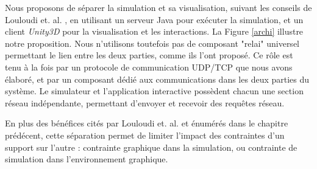 	
	Nous proposons de séparer la simulation et sa visualisation, suivant les conseils de Louloudi et. al. \cite{louloudi_new_2012}, en utilisant un serveur Java pour exécuter la simulation, et un client \textit{Unity3D} pour la visualisation et les interactions. La Figure \ref{archi} illustre notre proposition. Nous n'utilisons toutefois pas de composant "relai" universel permettant le lien entre les deux parties, comme ils l'ont proposé. Ce rôle est tenu à la fois par un protocole de communication UDP/TCP que nous avons élaboré, et par un composant dédié aux communications dans les deux parties du système. Le simulateur et l'application interactive possèdent chacun une section réseau indépendante, permettant d'envoyer et recevoir des requêtes réseau.
	
	En plus des bénéfices cités par Louloudi et. al. \cite{louloudi_new_2012} et énumérés dans le chapitre prédécent, cette séparation permet de limiter l'impact des contraintes d'un support sur l'autre : contrainte graphique dans la simulation, ou contrainte de simulation dans l'environnement graphique. 	
	
